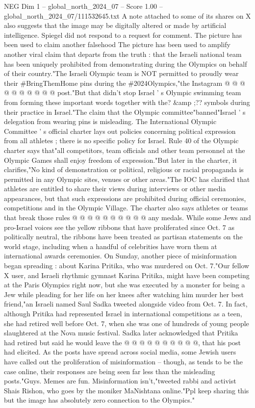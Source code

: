 \begin{textsample}{NEG Dim 1 – global\_north\_2024\_07 – Score 1.00 – global\_north\_2024\_07/111532645.txt}
A note attached to some of its shares on X also suggests that the image may be digitally altered or made by artificial intelligence.
Spiegel did not respond to a request for comment.
The picture has been used to claim another falsehood The picture has been used to amplify another viral claim that departs from the truth : that the Israeli national team has been uniquely prohibited from demonstrating during the Olympics on behalf of their country."The Israeli Olympic team is NOT permitted to proudly wear their \#BringThemHome pins during the \#2024Olympics,"the Instagram @ @ @ @ @ @ @ @ @ @ post."But that didn't stop Israel ' s Olympic swimming team from forming these important words together with the? \&amp ;?? symbols during their practice in Israel."The claim that the Olympic committee"banned"Israel ' s delegation from wearing pins is misleading.
The International Olympic Committee ' s official charter lays out policies concerning political expression from all athletes ; there is no specific policy for Israel.
Rule 40 of the Olympic charter says that"all competitors, team officials and other team personnel at the Olympic Games shall enjoy freedom of expression."But later in the charter, it clarifies,"No kind of demonstration or political, religious or racial propaganda is permitted in any Olympic sites, venues or other areas."The IOC has clarified that athletes are entitled to share their views during interviews or other media appearances, but that such expressions are prohibited during official ceremonies, competitions and in the Olympic Village.
The charter also says athletes or teams that break those rules @ @ @ @ @ @ @ @ @ @ any medals.
While some Jews and pro-Israel voices see the yellow ribbons that have proliferated since Oct. 7 as politically neutral, the ribbons have been treated as partisan statements on the world stage, including when a handful of celebrities have worn them at international awards ceremonies.
On Sunday, another piece of misinformation began spreading : about Karina Pritika, who was murdered on Oct. 7."Our fellow X user, and Israeli rhythmic gymnast Karina Pritika, might have been competing at the Paris Olympics right now, but she was executed by a monster for being a Jew while pleading for her life on her knees after watching him murder her best friend,"an Israeli named Saul Sadka tweeted alongside video from Oct. 7.
In fact, although Pritika had represented Israel in international competitions as a teen, she had retired well before Oct. 7, when she was one of hundreds of young people slaughtered at the Nova music festival.
Sadka later acknowledged that Pritika had retired but said he would leave the @ @ @ @ @ @ @ @ @ @, that his post had elicited.
As the posts have spread across social media, some Jewish users have called out the proliferation of misinformation -- though, as tends to be the case online, their responses are being seen far less than the misleading posts."Guys.
Memes are fun.
Misinformation isn't,"tweeted rabbi and activist Shais Rishon, who goes by the moniker MaNishtana online."Ppl keep sharing this but the image has absolutely zero connection to the Olympics."

\end{textsample}
